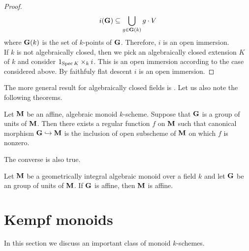 \begin{proof}
$$i(\mathbf{G})\subseteq \bigcup_{g\in \mathbf{G}(k)}g\cdot V$$
where $\mathbf{G}(k)$ is the set of $k$-points of $\mathbf{G}$. Therefore, $i$ is an open immersion.\\
If $k$ is not algebraically closed, then we pick an algebraically closed extension $K$ of $k$ and consider $1_{\mathrm{Spec}\, K}\times_k i$. This is an open immersion according to the case considered above. By faithfuly flat descent $i$ is an open immersion. 
\end{proof}
\noindent
The more general result for algebraically closed fields is {\cite[Theorem 1]{brion2014algebraic}}. Let us also note the following theorems.

\begin{theorem}\label{theorem:units_are_open_in_an_affine_algebraic_monoid}
Let $\mathbf{M}$ be an affine, algebraic monoid $k$-scheme. Suppose that $\mathbf{G}$ is a group of units of $\mathbf{M}$. Then there exists a regular function $f$ on $\mathbf{M}$ such that canonical morphism $\mathbf{G}\hookrightarrow \mathbf{M}$ is the inclusion of open subscheme of $\mathbf{M}$ on which $f$ is nonzero.
\end{theorem}
\noindent
The converse is also true.

\begin{theorem}\label{theorem:units_are_affine_then_monoid_is_affine}
Let $\mathbf{M}$ be a geometrically integral algebraic monoid over a field $k$ and let $\mathbf{G}$ be an group of units of $\mathbf{M}$. If $\mathbf{G}$ is affine, then $\mathbf{M}$ is affine.
\end{theorem}

\section{Kempf monoids}
\noindent
In this section we discuss an important class of monoid $k$-schemes.

